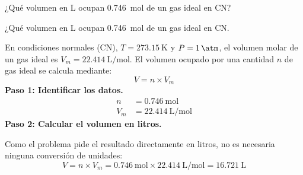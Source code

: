 \begin{exercise}
    ¿Qué volumen en \unit{\liter} ocupan \qty{0.746}{\mol} de un gas ideal en CN?
    \begin{solu}
        ¿Qué volumen en \unit{\liter} ocupan \qty{0.746}{\mol} de un gas ideal en CN.


        En condiciones normales (CN), $T = \qty{273.15}{\kelvin}$ y $P = \qty{1}{\atm}$,
        el volumen molar de un gas ideal es $V_m = \qty{22.414}{\liter\per\mol}$. El volumen
        ocupado por una cantidad $n$ de gas ideal se calcula mediante:
        \begin{equation*}
            V = n \times V_m
        \end{equation*}
        \textbf{Paso 1: Identificar los datos.}
        \begin{align*}
            n   &= \qty{0.746}{\mol} \\
            V_m &= \qty{22.414}{\liter\per\mol}
        \end{align*}
        \textbf{Paso 2: Calcular el volumen en litros.}

        Como el problema pide el resultado directamente en litros, no es necesaria ninguna
        conversión de unidades:
        \begin{equation*}
            V = n \times V_m = \qty{0.746}{\mol} \times \qty{22.414}{\liter\per\mol}
            = \boxed{\qty{16.721}{\liter}}
        \end{equation*}
    \end{solu}
\end{exercise}
